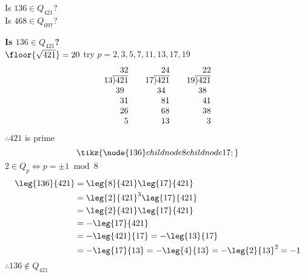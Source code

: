 Is $136\in Q_{421}$? \\
Is $468\in Q_{697}$?

\textbf{Is $136\in Q_{421}$?} \\
\soln $\floor{\sqrt{421}}=20$ try $p=2,3,5,7,11,13,17,19$
\[ 
\begin{array}[t]{@{}c@{}c@{}c@{}c@{}c@{}c@{}}
&&&&3&2\\\cline{3-6}
1&3&)&4&2&1\\
&&&3&9&\\
&&&&3&1\\
&&&&2&6\\
&&&&&5
\end{array}
\qquad
\begin{array}[t]{@{}c@{}c@{}c@{}c@{}c@{}c@{}}
&&&&2&4\\\cline{3-6}
1&7&)&4&2&1\\
&&&3&4&\\
&&&&8&1\\
&&&&6&8\\
&&&&1&3\\
\end{array}
\qquad
\begin{array}[t]{@{}c@{}c@{}c@{}c@{}c@{}c@{}}
&&&&2&2\\\cline{3-6}
1&9&)&4&2&1\\
&&&3&8&\\
&&&&4&1\\
&&&&3&8\\
&&&&&3\\
\end{array}
\]
%
$\therefore421$ is prime
\[ \tikz{\node{136}child{node{8}}child{node{17}};} \]
$2\in Q_p\iff p=\pm1\bmod8$
\begin{align*}
\leg{136}{421} &= \leg{8}{421}\leg{17}{421} \\
&= \leg{2}{421}^3 \leg{17}{421} \\
&= \leg{2}{421} \leg{17}{421} \\
&= -\leg{17}{421} \\
&= -\leg{421}{17} = -\leg{13}{17} \\
&= -\leg{17}{13} = -\leg{4}{13} = -\leg{2}{13}^2 = -1
\end{align*}
$\therefore136\notin Q_{421}$

